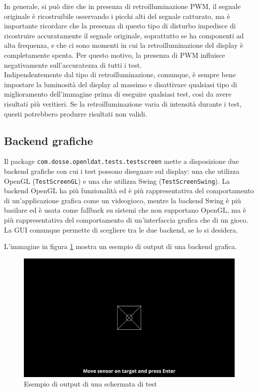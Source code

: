 In generale, si può dire che in presenza di retroilluminazione PWM, il segnale originale è ricostruibile osservando i picchi alti del segnale catturato, ma è importante ricordare che la presenza di questo tipo di disturbo impedisce di ricostruire accuratamente il segnale originale, soprattutto se ha componenti ad alta frequenza, e che ci sono momenti in cui la retroilluminazione del display è completamente spenta. Per questo motivo, la presenza di PWM influisce negativamente sull'accuratezza di tutti i test.\\
Indipendentemente dal tipo di retroilluminazione, comunque, è sempre bene impostare la luminosità del display al massimo e disattivare qualsiasi tipo di miglioramento dell'immagine prima di eseguire qualsiasi test, così da avere risultati più veritieri. Se la retroilluminazione varia di intensità durante i test, questi potrebbero produrre risultati non validi.

\subsection{Backend grafiche}
Il package \texttt{com.dosse.openldat.tests.testscreen} mette a disposizione due backend grafiche con cui i test possono disegnare sul display: una che utilizza OpenGL (\texttt{TestScreenGL}) e una che utilizza Swing (\texttt{TestScreenSwing}). La backend OpenGL ha più funzionalità ed è più rappresentativa del comportamento di un'applicazione grafica come un videogioco, mentre la backend Swing è più basilare ed è usata come fallback su sistemi che non supportano OpenGL, ma è più rappresentativa del comportamento di un'interfaccia grafica che di un gioco. La GUI comunque permette di scegliere tra le due backend, se lo si desidera.

L'immagine in figura \ref{fig:testscreen_example} mostra un esempio di output di una backend grafica.

\begin{figure}[h]
	\centering
	\includegraphics[width=\textwidth]{Chapter04/res/testscreen_example.png}
	\caption{Esempio di output di una schermata di test}
	\label{fig:testscreen_example}
\end{figure}


